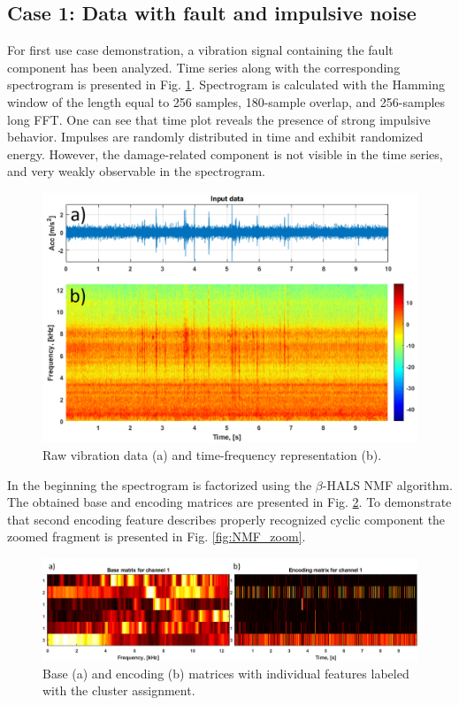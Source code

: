 \documentclass[3p,times]{elsarticle}
\begin{document}
\subsection{Case 1: Data with fault and impulsive noise}\label{case1}

For first use case demonstration, a vibration signal containing the fault component has been analyzed. Time series along with the corresponding spectrogram is presented in Fig. \ref{fig:raw_signal_all}. Spectrogram is calculated with the Hamming window of the length equal to 256 samples, 180-sample overlap, and 256-samples long FFT. One can see that time plot reveals the presence of strong impulsive behavior. Impulses are randomly distributed in time and exhibit randomized energy. However, the damage-related component is not visible in the time series, and very weakly observable in the spectrogram.

\begin{figure}[ht!]
\centering
\includegraphics[width=.8\textwidth]{figs/raw.png}
\caption{Raw vibration data (a) and time-frequency representation (b).}
\label{fig:raw_signal_all}
\end{figure}

In the beginning the spectrogram is factorized using the $\beta$-HALS NMF algorithm. The obtained base and encoding matrices are presented in Fig. \ref{fig:NMF_matrix}. To demonstrate that second encoding feature describes properly recognized cyclic component the zoomed fragment is presented in Fig. \ref{fig:NMF_zoom}.

\begin{figure}[ht!]
\centering
\includegraphics[width=.85\textwidth]{figs/mats.png}
\caption{Base (a) and encoding (b) matrices with individual features labeled with the cluster assignment.}
\label{fig:NMF_matrix}
\end{figure}
\end{document}
